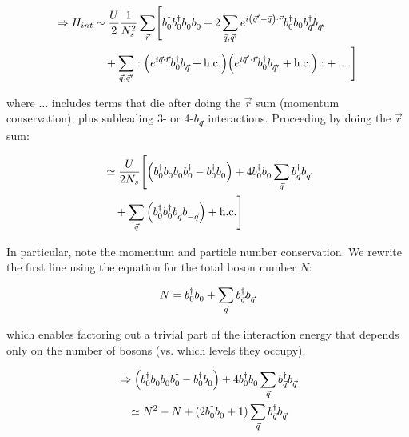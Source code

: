 \documentclass{article}
\newcommand{\egreg}{\vphantom{-}} %
\begin{document}
\begin{align*}
    \Rightarrow H_{int} &\sim \dfrac{U}{2} \dfrac{1}{N_s^2} \sum_{\vec{r}} \Biggl[
        b_0^{\dagger}b_0^{\dagger}b_0^{\egreg}b_0^{\egreg} + 2 \sum_{\vec{q}, \vec{q}'} e^{ i \qty(\vec{q}' - \vec{q})\cdot\vec{r}} b_0^{\dagger} b_0 b_{\vec{q}}^{\dagger} b_{\vec{q}'}^{\egreg} \\
    &\quad + \sum_{\vec{q}, \vec{q}'}:\qty(
        e^{ i \vec{q}\cdot\vec{r}} b_0^{\dagger} b_{\vec{q}}^{\egreg} + \text{h.c.}
    )\qty(
        e^{ i \vec{q}'\cdot\vec{r}} b_0^{\dagger} b_{\vec{q}'}^{\egreg} + \text{h.c.}
    ): + \ldots 
    \Biggr]
\end{align*}

where $\ldots$ includes terms that die after doing the $\vec{r}$ sum (momentum conservation), plus subleading 3- or 4-$b_{\vec{q}}^{\egreg}$ interactions. Proceeding by doing the $\vec{r}$ sum:

\begin{align*}
    &\simeq \dfrac{U}{2N_s} \Biggl[
        \qty(b_0^{\dagger}b_0^{\egreg}b_0^{\egreg}b_0^{\dagger} - b_0^{\dagger}b_0^{\egreg}) + 4 b_0^{\dagger}b_0^{\egreg} \sum_{\vec{q}} b_{\vec{q}}^{\dagger}b_{\vec{q}}^{\egreg} \\
    & \quad + \sum_{\vec{q}} \qty(b_0^{\dagger}b_0^{\dagger}b_{\vec{q}}^{\egreg}b_{-\vec{q}}^{\egreg}) + \text{h.c.}
    \Biggr]
\end{align*}

In particular, note the momentum and particle number conservation. We rewrite the first line using the equation for the total boson number $N$:

\begin{equation*}
    N = b_0^{\dagger}b_0^{\egreg} + \sum_{\vec{q}} b_{\vec{q}}^{\dagger} b_{\vec{q}}^{\egreg}   
\end{equation*}

which enables factoring out a trivial part of the interaction energy that depends only on the number of bosons (vs. which levels they occupy).

\begin{align*}
    &\Rightarrow \qty(b_0^{\dagger}b_0^{\egreg}b_0^{\egreg}b_0^{\dagger} - b_0^{\dagger}b_0^{\egreg}) + 4 b_0^{\dagger}b_0^{\egreg} \sum_{\vec{q}} b_{\vec{q}}^{\dagger}b_{\vec{q}}^{\egreg} \\
    & \quad \simeq N^2 - N + (2 b_0^{\dagger}b_0^{\egreg} + 1)\sum_{\vec{q}} b_{\vec{q}}^{\dagger}b_{\vec{q}}^{\egreg}
\end{align*}
\end{document}
